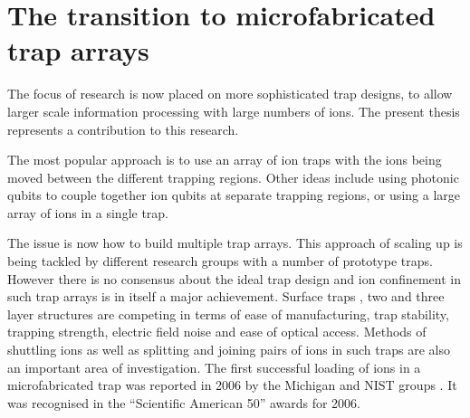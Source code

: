 \section{The transition to microfabricated trap arrays}
\label{sec:transition}

The focus of research is now placed on more sophisticated trap designs, to allow larger scale information processing with large numbers of ions. The present thesis represents a contribution to this research.

The most popular approach is to use an array of ion traps with the ions being moved between the different trapping regions. Other ideas include using photonic qubits to couple together ion qubits at separate trapping regions, or using a large array of ions in a single trap.

The issue is now how to build multiple trap arrays. This approach of scaling up is being tackled by different research groups with a number of prototype traps. However there is no consensus about the ideal trap design and ion confinement in such trap arrays is in itself a major achievement. Surface traps \cite{Seidelin2006}, two \cite{Stick2006} and three layer \cite{Hensinger2006} structures are competing in terms of ease of manufacturing, trap stability, trapping strength, electric field noise and ease of optical access. 
%
Methods of shuttling ions \cite{Hensinger2006,Huber2008} as well as splitting and joining pairs of ions \cite{Hensinger2006} in such traps are also an important area of investigation. The first successful loading of ions in a microfabricated trap was reported in 2006 by the Michigan \cite{Stick2006} and NIST groups \cite{Seidelin2006}. It was recognised in the ``Scientific American 50'' awards for 2006.
 
